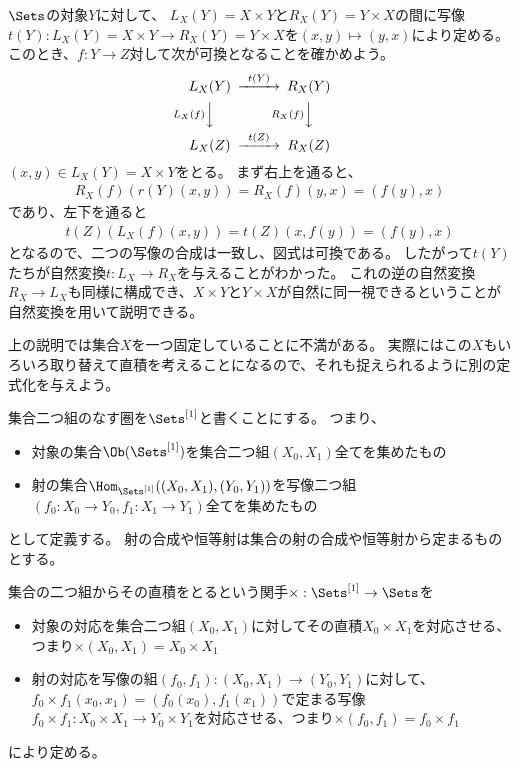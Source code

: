\documentclass[uplatex]{jsarticle}
\begin{document}
$\Sets$の対象$Y$に対して、
$L_X(Y)=X\times Y$と$R_X(Y)=Y \times X$の間に写像$t(Y):L_X(Y)=X \times Y \to R_X(Y)=Y \times X$を$(x,y) \mapsto (y,x)$により定める。
このとき、$f:Y\to Z$対して次が可換となることを確かめよう。
\[
\begin{CD}
L_X(Y)@>t(Y)>>R_X(Y)\\
@VL_X(f)VV@VR_X(f)VV\\
L_X(Z)@>t(Z)>>R_X(Z)
\end{CD}
\]
$(x,y) \in L_X(Y)=X\times Y$をとる。
まず右上を通ると、
\begin{align*}
R_X(f)(r(Y)(x,y))=R_X(f)(y,x)=(f(y),x)
\end{align*}
であり、左下を通ると
\begin{align*}
t(Z)(L_X(f)(x,y))=t(Z)(x,f(y))=(f(y),x)
\end{align*}
となるので、二つの写像の合成は一致し、図式は可換である。
したがって$t(Y)$たちが自然変換$t:L_X \to R_X$を与えることがわかった。
これの逆の自然変換$R_X \to L_X$も同様に構成でき、$X \times Y$と$Y \times X$が自然に同一視できるということが自然変換を用いて説明できる。

\vspace{10pt}
上の説明では集合$X$を一つ固定していることに不満がある。
実際にはこの$X$もいろいろ取り替えて直積を考えることになるので、それも捉えられるように別の定式化を与えよう。

集合二つ組のなす圏を$\Sets^{[1]}$と書くことにする。
つまり、
\begin{itemize}
\item 対象の集合$\Ob(\Sets^{[1]})$を集合二つ組$(X_0,X_1)$全てを集めたもの
\item 射の集合$\Hom_{\Sets^{[1]}}((X_0,X_1),(Y_0,Y_1))$を写像二つ組$(f_0:X_0 \to Y_0, f_1:X_1\to Y_1)$全てを集めたもの
\end{itemize}
として定義する。
射の合成や恒等射は集合の射の合成や恒等射から定まるものとする。

集合の二つ組からその直積をとるという関手$\times:\Sets^{[1]} \to \Sets$を
\begin{itemize}
\item 対象の対応を集合二つ組$(X_0,X_1)$に対してその直積$X_0 \times X_1$を対応させる、つまり$\times(X_0,X_1)=X_0\times X_1$
\item 射の対応を写像の組$(f_0,f_1):(X_0,X_1) \to (Y_0,Y_1)$に対して、$f_0\times f_1(x_0,x_1)=(f_0(x_0),f_1(x_1))$で定まる写像$f_0\times f_1:X_0 \times X_1 \to Y_0 \times Y_1$を対応させる、つまり$\times(f_0,f_1)=f_0\times f_1$
\end{itemize}
により定める。
\end{document}
